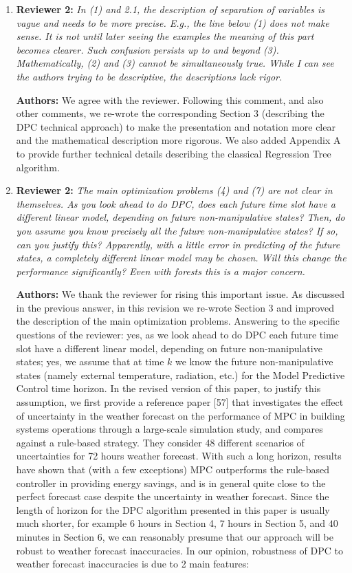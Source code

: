 \documentclass{article}
\begin{document}
\begin{enumerate}
\item \textbf{Reviewer 2:} \textit{In (1) and 2.1, the description of separation of variables is vague and needs to be more precise. E.g., the line below (1) does not make sense. It is not until later seeing the examples the meaning of this part becomes clearer. Such confusion persists up to and beyond (3). Mathematically, (2) and (3) cannot be simultaneously true. While I can see the authors trying to be descriptive, the descriptions lack rigor.} 



\textbf{Authors:} We agree with the reviewer. Following this comment, and also other comments, we re-wrote the corresponding Section 3 (describing the DPC technical approach) to make the presentation and notation more clear and the mathematical description more rigorous. We also added Appendix A to provide further technical details describing the classical Regression Tree algorithm.


\item \textbf{Reviewer 2:} \textit{The main optimization problems (4) and (7) are not clear in themselves. As you look ahead to do DPC, does each future time slot have a different linear model, depending on future non-manipulative states? Then, do you assume you know precisely all the future non-manipulative states? If so, can you justify this? Apparently, with a little error in predicting of the future states, a completely different linear model may be chosen. Will this change the performance significantly? Even with forests this is a major concern.}



\textbf{Authors:} We thank the reviewer for rising this important issue. As discussed in the previous answer, in this revision we re-wrote Section 3 and improved the description of the main optimization problems. Answering to the specific questions of the reviewer: yes, as we look ahead to do DPC each future time slot have a different linear model, depending on future non-manipulative states; yes, we assume that at time $k$ we know the future non-manipulative states (namely external temperature, radiation, etc.) for the Model Predictive Control time horizon. In the revised version of this paper, to justify this assumption, we first provide a reference paper [57] that investigates the effect of uncertainty in the weather forecast on the performance of MPC in building systems operations through a large-scale simulation study, and compares against a rule-based strategy. They consider 48 different scenarios of uncertainties for 72 hours weather forecast. With such a long horizon, results have shown that (with a few exceptions) MPC outperforms the rule-based controller in providing energy savings, and is in general quite close to the perfect forecast case despite the uncertainty in weather forecast. Since the length of horizon for the DPC algorithm presented in this paper is usually much shorter, for example $6$ hours in Section 4, $7$ hours in Section 5, and $40$ minutes in Section 6, we can reasonably presume that our approach will be robust to weather forecast inaccuracies. In our opinion, robustness of DPC to weather forecast inaccuracies is due to 2 main features:


\end{enumerate}
\end{document}
